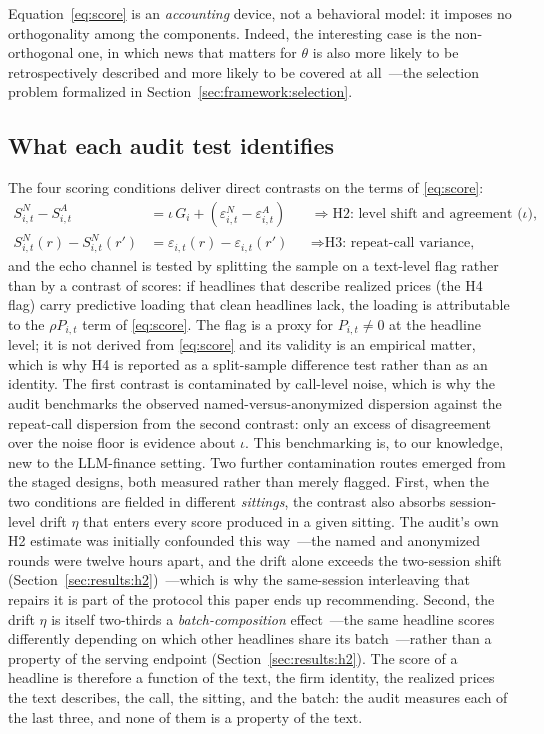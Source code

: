 Equation~\eqref{eq:score} is an \emph{accounting} device, not a behavioral model: it imposes no orthogonality among the components. Indeed, the interesting case is the non-orthogonal one, in which news that matters for $\theta$ is also more likely to be retrospectively described and more likely to be covered at all~---the selection problem formalized in Section~\ref{sec:framework:selection}.

\subsection{What each audit test identifies}

The four scoring conditions deliver direct contrasts on the terms of \eqref{eq:score}:
\begin{align}
S^{N}_{i,t} - S^{A}_{i,t} &= \iota\,G_i + (\varepsilon^{N}_{i,t} - \varepsilon^{A}_{i,t})
&&\Rightarrow \text{H2: level shift and agreement (}\iota\text{),} \label{eq:contrast1}\\
S^{N}_{i,t}(r) - S^{N}_{i,t}(r') &= \varepsilon_{i,t}(r) - \varepsilon_{i,t}(r')
&&\Rightarrow \text{H3: repeat-call variance,} \label{eq:contrast2}
\end{align}
and the echo channel is tested by splitting the sample on a text-level flag rather than by a contrast of scores: if headlines that describe realized prices (the H4 flag) carry predictive loading that clean headlines lack, the loading is attributable to the $\rho P_{i,t}$ term of \eqref{eq:score}. The flag is a proxy for $P_{i,t}\neq 0$ at the headline level; it is not derived from \eqref{eq:score} and its validity is an empirical matter, which is why H4 is reported as a split-sample difference test rather than as an identity. The first contrast is contaminated by call-level noise, which is why the audit benchmarks the observed named-versus-anonymized dispersion against the repeat-call dispersion from the second contrast: only an excess of disagreement over the noise floor is evidence about $\iota$. This benchmarking is, to our knowledge, new to the LLM-finance setting. Two further contamination routes emerged from the staged designs, both measured rather than merely flagged. First, when the two conditions are fielded in different \emph{sittings}, the contrast also absorbs session-level drift $\eta$ that enters every score produced in a given sitting. The audit's own H2 estimate was initially confounded this way~---the named and anonymized rounds were twelve hours apart, and the drift alone exceeds the two-session shift (Section~\ref{sec:results:h2})~---which is why the same-session interleaving that repairs it is part of the protocol this paper ends up recommending. Second, the drift $\eta$ is itself two-thirds a \emph{batch-composition} effect~---the same headline scores differently depending on which other headlines share its batch~---rather than a property of the serving endpoint (Section~\ref{sec:results:h2}). The score of a headline is therefore a function of the text, the firm identity, the realized prices the text describes, the call, the sitting, and the batch: the audit measures each of the last three, and none of them is a property of the text.

